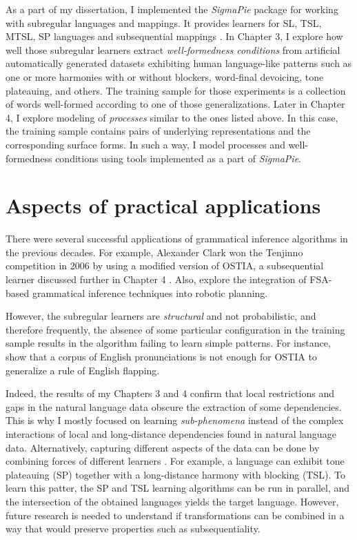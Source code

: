 As a part of my dissertation, I implemented the \emph{SigmaPie} package \href{https://pypi.org/project/SigmaPie/}{\faCube} for working with subregular languages and mappings.
It provides learners for SL, TSL, MTSL, SP languages and subsequential mappings \citep{sigmapie}.
In Chapter 3, I explore how well those subregular learners extract \emph{well-formedness conditions} from artificial automatically generated datasets exhibiting human language-like patterns such as one or more harmonies with or without blockers, word-final devoicing, tone plateauing, and others.
The training sample for those experiments is a collection of words well-formed according to one of those generalizations.
Later in Chapter 4, I explore modeling of \emph{processes} similar to the ones listed above.
In this case, the training sample contains pairs of underlying representations and the corresponding surface forms.
In such a way, I model processes and well-formedness conditions using tools implemented as a part of \emph{SigmaPie}.


\section{Aspects of practical applications}
\label{aspects}


There were several successful applications of grammatical inference algorithms in the previous decades.
For example, Alexander Clark won the Tenjinno competition in 2006 by using a modified version of OSTIA, a subsequential learner discussed further in Chapter 4 \citep{OncinaEtAl1993,Clark2006}.
Also, \cite{Chandlee-FuEtAl-2012-IGIRP} explore the integration of FSA-based grammatical inference techniques into robotic planning.


However, the subregular learners are \emph{structural} and not probabilistic, and therefore frequently, the absence of some particular configuration in the training sample results in the algorithm failing to learn simple patterns.
For instance, \cite{GildeaJurafsky1996} show that a corpus of English pronunciations is not enough for OSTIA to generalize a rule of English flapping.


Indeed, the results of my Chapters 3 and 4 confirm that local restrictions and gaps in the natural language data obscure the extraction of some dependencies.
This is why I mostly focused on learning \emph{sub-phenomena} instead of the complex interactions of local and long-distance dependencies found in natural language data.
Alternatively, capturing different aspects of the data can be done by combining forces of different learners \citep{Heinz10ldp,HeinzIdsardi13}.
For example, a language can exhibit tone plateauing (SP) together with a long-distance harmony with blocking (TSL).
To learn this patter, the SP and TSL learning algorithms can be run in parallel, and the intersection of the obtained languages yields the target language.
However, future research is needed to understand if transformations can be combined in a way that would preserve properties such as subsequentiality.


